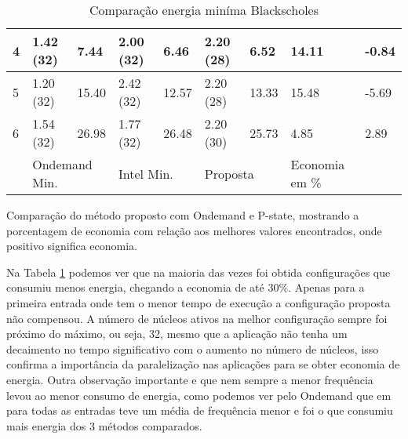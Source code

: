 \begin{table}[H]
{\begin{tabular}{l|l|l|l|l|l|l|ll}
			\multicolumn{1}{l|}{4} & 1.42 (32) & 7.44 & 2.00 (32) & 6.46 & 2.20 (28)  & 6.52 & \multicolumn{1}{l|}{14.11} & \multicolumn{1}{l}{-0.84} \\ \hline
			\multicolumn{1}{l|}{5} & 1.20 (32) & 15.40 & 2.42 (32) & 12.57 & 2.20 (28)  & 13.33 & \multicolumn{1}{l|}{15.48} & \multicolumn{1}{l}{-5.69} \\ \hline
			\multicolumn{1}{l|}{6} & 1.54 (32) & 26.98 & 1.77 (32) & 26.48 & 2.20 (30)  & 25.73 & \multicolumn{1}{l|}{4.85} & \multicolumn{1}{l}{2.89} \\ \hline
			& \multicolumn{2}{l|}{Ondemand Min.} & \multicolumn{2}{l|}{Intel Min.} & \multicolumn{2}{l|}{Proposta} & Economia em \% & \\ 
		\end{tabular}
	}
	\caption{Comparação energia miníma Blackscholes}{Comparação do método proposto com Ondemand e P-state, mostrando a porcentagem de economia com relação aos melhores valores encontrados, onde positivo significa economia.}
	\label{tab:Blackscholesfreq}
\end{table}

Na Tabela \ref{tab:Blackscholesfreq} podemos ver que na maioria das vezes foi obtida configurações que consumiu menos energia, chegando a economia de até 30\%. Apenas para a primeira entrada onde tem o menor tempo de execução a configuração proposta não compensou. A número de núcleos ativos na melhor configuração sempre foi próximo do máximo, ou seja, 32, mesmo que a aplicação não tenha um decaimento no tempo significativo com o aumento no número de núcleos, isso confirma a importância da paralelização nas aplicações para se obter economia de energia. Outra observação importante e que nem sempre a menor frequência levou ao menor consumo de energia, como podemos ver pelo Ondemand que em para todas as entradas teve um média de frequência menor e foi o que consumiu mais energia dos 3 métodos comparados.

